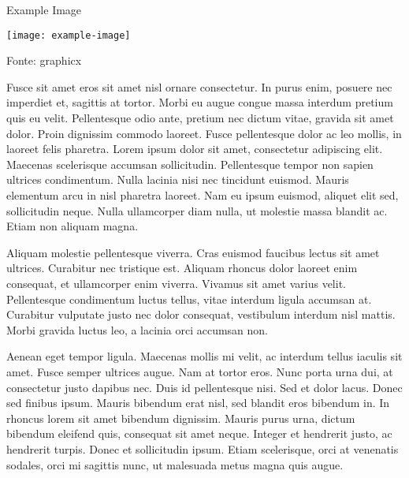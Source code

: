 \documentclass[twocolumn,10pt]{article}
\begin{document}
\begin{graphic}
    \centering
    \caption{Example Image}
    \vspace{5pt}
    \texttt{[image: example-image]}
    \vspace{5pt}
    {\par\small Fonte: graphicx}
    \label{fig:example-image}
\end{graphic}

Fusce sit amet eros sit amet nisl ornare consectetur. In purus enim, posuere nec imperdiet et, sagittis at tortor. Morbi eu augue congue massa interdum pretium quis eu velit. Pellentesque odio ante, pretium nec dictum vitae, gravida sit amet dolor. Proin dignissim commodo laoreet. Fusce pellentesque dolor ac leo mollis, in laoreet felis pharetra. Lorem ipsum dolor sit amet, consectetur adipiscing elit. Maecenas scelerisque accumsan sollicitudin. Pellentesque tempor non sapien ultrices condimentum. Nulla lacinia nisi nec tincidunt euismod. Mauris elementum arcu in nisl pharetra laoreet. Nam eu ipsum euismod, aliquet elit sed, sollicitudin neque. Nulla ullamcorper diam nulla, ut molestie massa blandit ac. Etiam non aliquam magna.

Aliquam molestie pellentesque viverra. Cras euismod faucibus lectus sit amet ultrices. Curabitur nec tristique est. Aliquam rhoncus dolor laoreet enim consequat, et ullamcorper enim viverra. Vivamus sit amet varius velit. Pellentesque condimentum luctus tellus, vitae interdum ligula accumsan at. Curabitur vulputate justo nec dolor consequat, vestibulum interdum nisl mattis. Morbi gravida luctus leo, a lacinia orci accumsan non.

Aenean eget tempor ligula. Maecenas mollis mi velit, ac interdum tellus iaculis sit amet. Fusce semper ultrices augue. Nam at tortor eros. Nunc porta urna dui, at consectetur justo dapibus nec. Duis id pellentesque nisi. Sed et dolor lacus. Donec sed finibus ipsum. Mauris bibendum erat nisl, sed blandit eros bibendum in. In rhoncus lorem sit amet bibendum dignissim. Mauris purus urna, dictum bibendum eleifend quis, consequat sit amet neque. Integer et hendrerit justo, ac hendrerit turpis. Donec et sollicitudin ipsum. Etiam scelerisque, orci at venenatis sodales, orci mi sagittis nunc, ut malesuada metus magna quis augue. 
\end{document}
